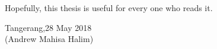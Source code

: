 \begin{spacing}{1.25}
	Hopefully, this thesis is useful for every one who reads it.

\begin{flushright}
Tangerang,28 May 2018 \\ \vspace{1.25cm}
(Andrew Mahisa Halim)\\
\end{flushright}

\end{spacing}
